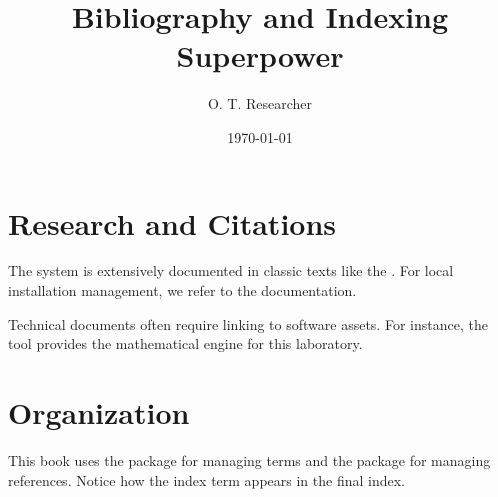 \documentclass{otbook}
\title{Bibliography and Indexing Superpower}
\author{O. T. Researcher}
\date{\today}
\begin{document}
\makeotbooktitle

\chapter{Research and Citations}

The  system is extensively documented in classic texts like the \textcite{latexcompanion}. For local installation management, we refer to the \textcite{miktex} documentation.

Technical documents often require linking to software assets. For instance, the  tool \cite{otcalculator} provides the mathematical engine for this laboratory.

\chapter{Organization}

This book uses the  package for managing terms and the  package for managing references. Notice how the index term  appears in the final index.

\printotindex

\printotbibliography
\end{document}
